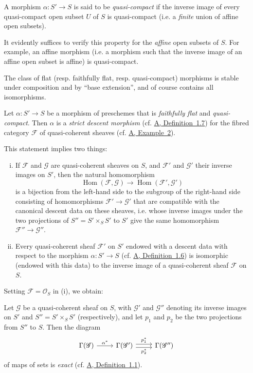 \documentclass{article}
\theoremstyle{plain}
\newenvironment{theorem}[1]
  {\renewcommand\theinnercustomtheorem{#1}\innercustomtheorem}
  {\endinnercustomtheorem}
\newenvironment{corollary}[1]
  {\renewcommand\theinnercustomcorollary{#1}\innercustomcorollary}
  {\endinnercustomcorollary}
\theoremstyle{definition}
\newenvironment{definition}[1]
  {\renewcommand\theinnercustomdefinition{#1}\innercustomdefinition}
  {\endinnercustomdefinition}
\newcommand{\sh}[1]{{\mathscr{#1}}}
\DeclareMathOperator{\Hom}{Hom}
\newcommand{\oldpage}[1]{\marginpar{\footnotesize$\Big\vert$ \textit{p.~#1}}}
\begin{document}
\begin{definition}{1.2}
  A morphism $\alpha\colon S'\to S$ is said to be \emph{quasi-compact} if the inverse image of every quasi-compact open subset $U$ of $S$ is quasi-compact (i.e. a \emph{finite} union of affine open subsets).
\end{definition}

It evidently suffices to verify this property for the \emph{affine} open subsets of $S$.
For example, an affine morphism (i.e. a morphism such that the inverse image of an affine open subset is affine) is quasi-compact.

The class of flat (resp. faithfully flat, resp. quasi-compact) morphisms is stable under composition and by ``base extension'', and of course contains all isomorphisms.

\begin{theorem}{1}
\label{theorem:B.1(1)}
  Let $\alpha\colon S'\to S$ be a morphism of preschemes that is \emph{faithfully flat} and \emph{quasi-compact}.
  Then $\alpha$ is a \emph{strict descent morphism} (cf. \hyperref[definition:A.1.7]{A, Definition~1.7}) for the fibred category $\sh{F}$ of quasi-coherent sheaves (cf. \hyperref[example:A.1.1(2)]{A, Example~2}).
\end{theorem}

This statement implies two things:
\begin{enumerate}[(i)]
  \item If $\sh{F}$ and $\sh{G}$ are quasi-coherent sheaves on $S$, and $\sh{F}'$ and $\sh{G}'$ their inverse images on $S'$, then the natural homomorphism
    \[
      \Hom(\sh{F},\sh{G}) \to \Hom(\sh{F}',\sh{G}')
    \]
    is a bijection from the left-hand side to the subgroup of the right-hand side consisting of homomorphisms $\sh{F}'\to\sh{G}'$ that are compatible with the canonical descent data on these sheaves, i.e. whose inverse images under the two projections of $S''=S'\times_S S'$ to $S'$ give the same homomorphism $\sh{F}''\to\sh{G}''$.
  \item Every quasi-coherent sheaf $\sh{F}'$ on $S'$ endowed with a descent data with respect to the morphism $\alpha\colon S'\to S$ (cf. \hyperref[definition:A.1.6]{A, Definition~1.6}) is isomorphic (endowed with this data) to the inverse image of a quasi-coherent sheaf $\sh{F}$ on $S$.
\end{enumerate}

Setting $\sh{F}=\sh{O}_S$ in (i), we obtain:

\begin{corollary}{1}
\label{corollary:B.1(1)}
  Let $\sh{G}$ be a quasi-coherent sheaf on $S$, with $\sh{G}'$ and $\sh{G}''$ denoting its inverse images on $S'$ and $S''=S'\times_S S'$ (respectively), and let $p_1$ and $p_2$ be the two projections from $S''$ to $S$.
  Then the diagram
\oldpage{190-18}
  \[
    \begin{tikzcd}
      \Gamma(\sh{G}) \rar["\alpha^*"]
      & \Gamma(\sh{G}') \rar[shift left=1,"p_1^*"] \rar[shift right=1,swap,"p_2^*"]
      & \Gamma(\sh{G}'')
    \end{tikzcd}
  \]
  of maps of sets is \emph{exact} (cf. \hyperref[definition:A.1.1]{A, Definition~1.1}).
\end{corollary}
\end{document}
